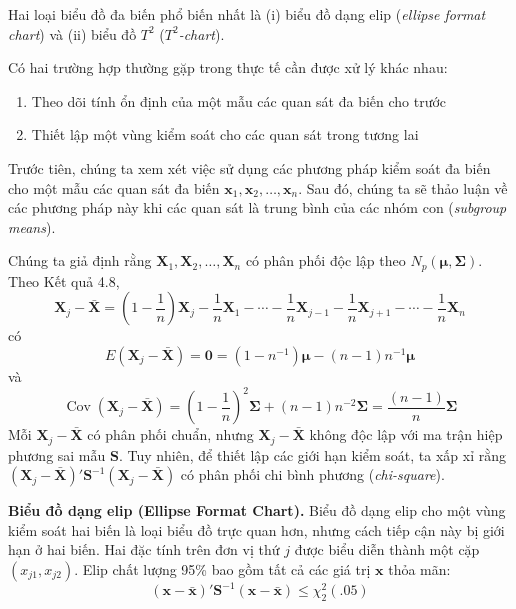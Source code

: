 Hai loại biểu đồ đa biến phổ biến nhất là (i) biểu đồ dạng elip (\textit{ellipse format chart}) và (ii) biểu đồ $T^2$ (\textit{$T^2$-chart}).

Có hai trường hợp thường gặp trong thực tế cần được xử lý khác nhau:
\begin{enumerate}
    \item[\textbf{1.}] Theo dõi tính ổn định của một mẫu các quan sát đa biến cho trước
    \item[\textbf{2.}] Thiết lập một vùng kiểm soát cho các quan sát trong tương lai
\end{enumerate}

Trước tiên, chúng ta xem xét việc sử dụng các phương pháp kiểm soát đa biến cho một mẫu các quan sát đa biến $\mathbf{x}_1, \mathbf{x}_2, \ldots, \mathbf{x}_n$. Sau đó, chúng ta sẽ thảo luận về các phương pháp này khi các quan sát là trung bình của các nhóm con (\textit{subgroup means}).

\vspace{1.2em}
\vspace{0.8em}

Chúng ta giả định rằng $\mathbf{X}_1, \mathbf{X}_2, \ldots, \mathbf{X}_n$ có phân phối độc lập theo $N_p(\boldsymbol{\mu}, \boldsymbol{\Sigma})$. Theo Kết quả 4.8,
\[
\mathbf{X}_j - \bar{\mathbf{X}} = \left( 1 - \frac{1}{n} \right) \mathbf{X}_j - \frac{1}{n}\mathbf{X}_1 - \cdots - \frac{1}{n}\mathbf{X}_{j-1} - \frac{1}{n}\mathbf{X}_{j+1} - \cdots - \frac{1}{n}\mathbf{X}_n
\]
có
\[
E(\mathbf{X}_j - \bar{\mathbf{X}}) = \mathbf{0} = (1 - n^{-1})\boldsymbol{\mu} - (n - 1)n^{-1}\boldsymbol{\mu}
\]
và
\[
\operatorname{Cov}(\mathbf{X}_j - \bar{\mathbf{X}}) = \left( 1 - \frac{1}{n} \right)^2 \boldsymbol{\Sigma} + (n - 1)n^{-2}\boldsymbol{\Sigma} = \frac{(n - 1)}{n}\boldsymbol{\Sigma}
\]
Mỗi $\mathbf{X}_j - \bar{\mathbf{X}}$ có phân phối chuẩn, nhưng $\mathbf{X}_j - \bar{\mathbf{X}}$ không độc lập với ma trận hiệp phương sai mẫu $\mathbf{S}$. Tuy nhiên, để thiết lập các giới hạn kiểm soát, ta xấp xỉ rằng $(\mathbf{X}_j - \bar{\mathbf{X}})'\mathbf{S}^{-1}(\mathbf{X}_j - \bar{\mathbf{X}})$ có phân phối chi bình phương (\textit{chi-square}).

\vspace{0.5em}
\noindent\textbf{Biểu đồ dạng elip (Ellipse Format Chart).} Biểu đồ dạng elip cho một vùng kiểm soát hai biến là loại biểu đồ trực quan hơn, nhưng cách tiếp cận này bị giới hạn ở hai biến. Hai đặc tính trên đơn vị thứ $j$ được biểu diễn thành một cặp $(x_{j1}, x_{j2})$. Elip chất lượng 95\% bao gồm tất cả các giá trị $\mathbf{x}$ thỏa mãn:
\begin{equation}
(\mathbf{x} - \bar{\mathbf{x}})'\mathbf{S}^{-1}(\mathbf{x} - \bar{\mathbf{x}}) \le \chi^2_2(.05) \tag{5-32}
\end{equation}

